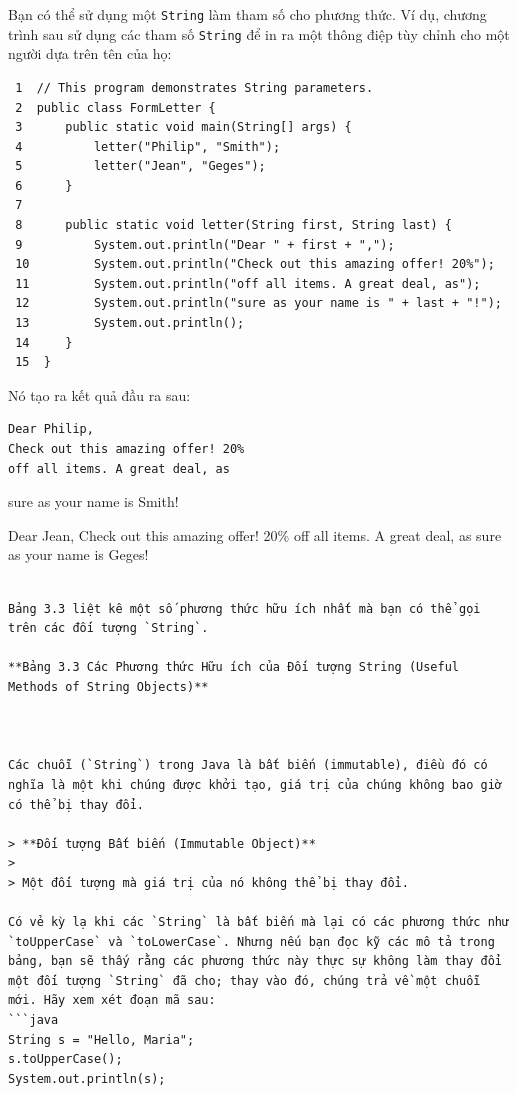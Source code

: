 Bạn có thể sử dụng một \texttt{String} làm tham số cho phương thức. Ví
dụ, chương trình sau sử dụng các tham số \texttt{String} để in ra một
thông điệp tùy chỉnh cho một người dựa trên tên của họ:

\begin{verbatim}
 1  // This program demonstrates String parameters.
 2  public class FormLetter {
 3      public static void main(String[] args) {
 4          letter("Philip", "Smith");
 5          letter("Jean", "Geges");
 6      }
 7
 8      public static void letter(String first, String last) {
 9          System.out.println("Dear " + first + ",");
 10         System.out.println("Check out this amazing offer! 20%");
 11         System.out.println("off all items. A great deal, as");
 12         System.out.println("sure as your name is " + last + "!");
 13         System.out.println();
 14     }
 15  }
\end{verbatim}

Nó tạo ra kết quả đầu ra sau:

\begin{verbatim}
Dear Philip, 
Check out this amazing offer! 20% 
off all items. A great deal, as 
\end{verbatim}

sure as your name is Smith!

Dear Jean, Check out this amazing offer! 20\% off all items. A great
deal, as sure as your name is Geges!

\begin{verbatim}

Bảng 3.3 liệt kê một số phương thức hữu ích nhất mà bạn có thể gọi trên các đối tượng `String`.

**Bảng 3.3 Các Phương thức Hữu ích của Đối tượng String (Useful Methods of String Objects)**



Các chuỗi (`String`) trong Java là bất biến (immutable), điều đó có nghĩa là một khi chúng được khởi tạo, giá trị của chúng không bao giờ có thể bị thay đổi.

> **Đối tượng Bất biến (Immutable Object)**
>
> Một đối tượng mà giá trị của nó không thể bị thay đổi.

Có vẻ kỳ lạ khi các `String` là bất biến mà lại có các phương thức như `toUpperCase` và `toLowerCase`. Nhưng nếu bạn đọc kỹ các mô tả trong bảng, bạn sẽ thấy rằng các phương thức này thực sự không làm thay đổi một đối tượng `String` đã cho; thay vào đó, chúng trả về một chuỗi mới. Hãy xem xét đoạn mã sau:
```java
String s = "Hello, Maria";
s.toUpperCase();
System.out.println(s);
\end{verbatim}

